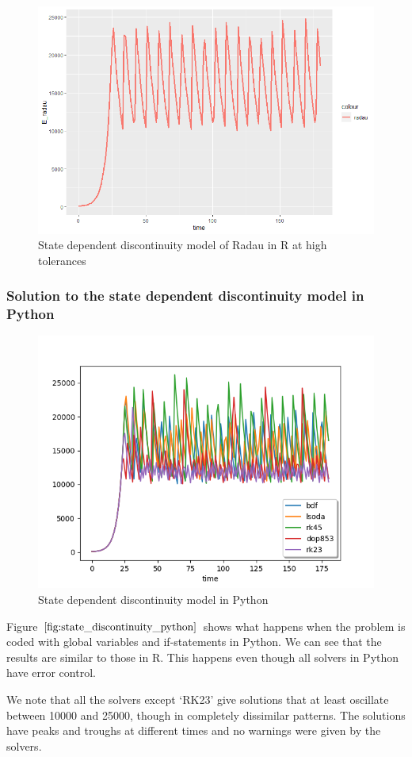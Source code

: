 \begin{figure}[H]
\centering
\includegraphics[width=0.7\linewidth]{./figures/state_discontinuity_sharp_radau_R}
\caption{State dependent discontinuity model of Radau in R at high tolerances}
\label{fig:state_discontinuity_radau_sharp_R}
\end{figure}

\subsubsection{Solution to the state dependent discontinuity model in Python}
\begin{figure}[H]
\centering
\includegraphics[width=0.7\linewidth]{./figures/state_discontinuity_py}
\caption{State dependent discontinuity model in Python}
\label{fig:state_discontinuity_python}
\end{figure}
Figure $\ref{fig:state_discontinuity_python}$ shows what happens when the problem is coded with global variables and if-statements in Python. We can see that the results are similar to those in R. This happens even though all solvers in Python have error control.

We note that all the solvers except `RK23' give solutions that at least oscillate between 10000 and 25000, though in completely dissimilar patterns. The solutions have peaks and troughs at different times and no warnings were given by the solvers.

